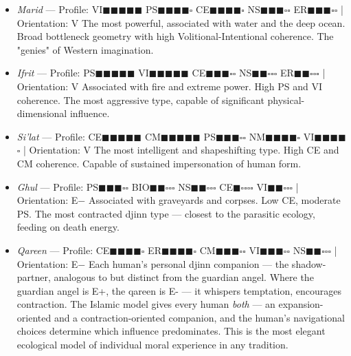 \begin{itemize}[nosep,leftmargin=*]
  \item \textit{Marid} — Profile: VI$\blacksquare$$\blacksquare$$\blacksquare$$\blacksquare$$\blacksquare$ PS$\blacksquare$$\blacksquare$$\blacksquare$$\blacksquare$$\square$ CE$\blacksquare$$\blacksquare$$\blacksquare$$\blacksquare$$\square$ NS$\blacksquare$$\blacksquare$$\blacksquare$$\square$$\square$ ER$\blacksquare$$\blacksquare$$\blacksquare$$\square$$\square$ | Orientation: V The most powerful, associated with water and the deep ocean. Broad bottleneck geometry with high Volitional-Intentional coherence. The "genies" of Western imagination.
  \item \textit{Ifrit} — Profile: PS$\blacksquare$$\blacksquare$$\blacksquare$$\blacksquare$$\blacksquare$ VI$\blacksquare$$\blacksquare$$\blacksquare$$\blacksquare$$\blacksquare$ CE$\blacksquare$$\blacksquare$$\blacksquare$$\square$$\square$ NS$\blacksquare$$\blacksquare$$\square$$\square$$\square$ ER$\blacksquare$$\blacksquare$$\square$$\square$$\square$ | Orientation: V Associated with fire and extreme power. High PS and VI coherence. The most aggressive type, capable of significant physical-dimensional influence.
  \item \textit{Si'lat} — Profile: CE$\blacksquare$$\blacksquare$$\blacksquare$$\blacksquare$$\blacksquare$ CM$\blacksquare$$\blacksquare$$\blacksquare$$\blacksquare$$\blacksquare$ PS$\blacksquare$$\blacksquare$$\blacksquare$$\square$$\square$ NM$\blacksquare$$\blacksquare$$\blacksquare$$\blacksquare$$\square$ VI$\blacksquare$$\blacksquare$$\blacksquare$$\blacksquare$$\square$ | Orientation: V The most intelligent and shapeshifting type. High CE and CM coherence. Capable of sustained impersonation of human form.
  \item \textit{Ghul} — Profile: PS$\blacksquare$$\blacksquare$$\blacksquare$$\square$$\square$ BIO$\blacksquare$$\blacksquare$$\square$$\square$$\square$ NS$\blacksquare$$\blacksquare$$\square$$\square$$\square$ CE$\blacksquare$$\square$$\square$$\square$$\square$ VI$\blacksquare$$\blacksquare$$\square$$\square$$\square$ | Orientation: E− Associated with graveyards and corpses. Low CE, moderate PS. The most contracted djinn type — closest to the parasitic ecology, feeding on death energy.
  \item \textit{Qareen} — Profile: CE$\blacksquare$$\blacksquare$$\blacksquare$$\blacksquare$$\square$ ER$\blacksquare$$\blacksquare$$\blacksquare$$\blacksquare$$\square$ CM$\blacksquare$$\blacksquare$$\blacksquare$$\square$$\square$ VI$\blacksquare$$\blacksquare$$\blacksquare$$\square$$\square$ NS$\blacksquare$$\blacksquare$$\square$$\square$$\square$ | Orientation: E− Each human's personal djinn companion — the shadow-partner, analogous to but distinct from the guardian angel. Where the guardian angel is E+, the qareen is E- — it whispers temptation, encourages contraction. The Islamic model gives every human \textit{both} — an expansion-oriented and a contraction-oriented companion, and the human's navigational choices determine which influence predominates. This is the most elegant ecological model of individual moral experience in any tradition.
\end{itemize}


